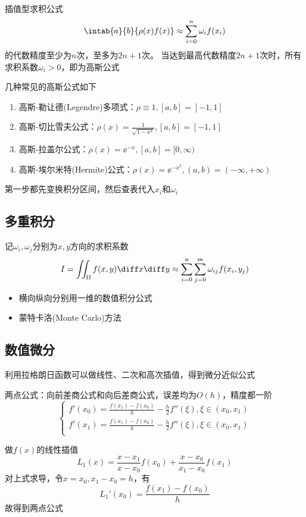 \begin{theorem}
    插值型求积公式
    \[\intab{a}{b}{\rho(x)f(x)}\approx\sum_{i=0}^n\omega_if(x_i)\]
    的代数精度至少为$n$次，至多为$2n+1$次。
    当达到最高代数精度$2n+1$次时，所有求积系数$\omega_i>0$，即为高斯公式
\end{theorem}

几种常见的高斯公式如下
\begin{enumerate}
    \item 高斯-勒让德(Legendre)多项式：$\rho\equiv 1,[a,b]=[-1,1]$
    \item 高斯-切比雪夫公式：$\rho(x)=\frac{1}{\sqrt{1-x^2}},[a,b]=[-1,1]$
    \item 高斯-拉盖尔公式：$\rho(x)=\ee^{-x},[a,b]=[0,\infty)$
    \item 高斯-埃尔米特(Hermite)公式：$\rho(x)=\ee^{-x^2},(a,b)=(-\infty,+\infty)$
\end{enumerate}
第一步都先变换积分区间，然后查表代入$x_i$和$\omega_i$

\subsection{多重积分}
记$\omega_i,\omega_j$分别为$x,y$方向的求积系数
\[I=\iint_\Omega f(x,y)\diff x\diff y\approx\sum_{i=0}^n\sum_{j=0}^m\omega_{ij}f(x_i,y_j)\]

\begin{itemize}
    \item 横向纵向分别用一维的数值积分公式
    \item 蒙特卡洛(Monte Carlo)方法
\end{itemize}

\subsection{数值微分}
利用拉格朗日函数可以做线性、二次和高次插值，得到微分近似公式

两点公式：向前差商公式和向后差商公式，误差均为$O(h)$，精度都一阶
\[\begin{cases}
    f'(x_0)=\frac{f(x_1)-f(x_0)}{h}-\frac{h}{2}f''(\xi),\xi\in(x_0,x_1)\\
    f'(x_1)=\frac{f(x_1)-f(x_0)}{h}-\frac{h}{2}f''(\xi),\xi\in(x_0,x_1)\\
\end{cases}\]
\begin{analysis}
    做$f(x)$的线性插值
    \[L_1(x)=\frac{x-x_1}{x-x_0}f(x_0)+\frac{x-x_0}{x_1-x_0}f(x_1)\]
    对上式求导，令$x=x_0,x_1-x_0=h$，有
    \[L_1'(x_0)=\frac{f(x_1)-f(x_0)}{h}\]
    故得到两点公式
\end{analysis}

